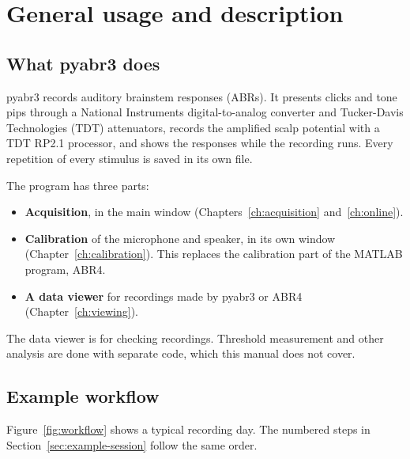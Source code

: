 \chapter{General usage and description}
\label{ch:general}

\section{What pyabr3 does}

pyabr3 records auditory brainstem responses
(ABRs). It presents clicks and tone pips through a National Instruments
digital-to-analog converter and Tucker-Davis Technologies (TDT) attenuators,
records the amplified scalp potential with a TDT RP2.1 processor, and shows the
responses while the recording runs. Every repetition of every stimulus is saved in
its own file.

The program has three parts:

\begin{itemize}
  \item \textbf{Acquisition}, in the main window (Chapters~\ref{ch:acquisition}
        and~\ref{ch:online}).
  \item \textbf{Calibration} of the microphone and speaker, in its own window
        (Chapter~\ref{ch:calibration}). This replaces the calibration part of the
        MATLAB program, ABR4.
  \item \textbf{A data viewer} for recordings made by pyabr3 or ABR4
        (Chapter~\ref{ch:viewing}).
\end{itemize}

The data viewer is for checking recordings. Threshold measurement and other analysis
are done with separate code, which this manual does not cover.

\section{Example workflow}

Figure~\ref{fig:workflow} shows a typical recording day. The numbered steps in
Section~\ref{sec:example-session} follow the same order.

